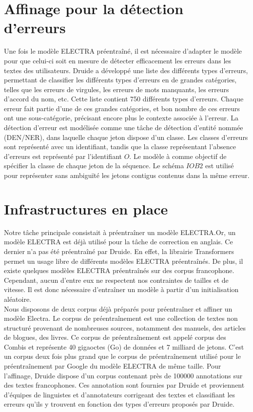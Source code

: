 \documentclass[12pt,twoside,maitrise]{dms}
\theoremstyle{definition}
\numberwithin{equation}{section}
\numberwithin{table}{chapter}
\numberwithin{figure}{chapter}
\begin{document}
\section{Affinage pour la détection d'erreurs}
Une fois le modèle ELECTRA préentraîné, il est nécessaire d'adapter le modèle
pour que celui-ci soit en mesure de détecter efficacement les erreurs dans les
textes des utilisateurs. Druide a développé une liste des différents types
d'erreurs, permettant de classifier les différents types d'erreurs en de
grandes catégories, telles que les erreurs de virgules, les erreurs de mots
manquants, les erreurs d'accord du nom, etc. Cette liste contient 750
différents types d'erreurs. Chaque erreur fait partie d'une de ces grandes
catégories, et bon nombre de ces erreurs ont une sous-catégorie, précisant
encore plus le contexte associée à l'erreur. La détection d'erreur est
modélisée comme une tâche de détection d'entité nommée (DEN/NER), dans laquelle
chaque jeton dispose d'un classe. Les classes d'erreurs sont représenté avec un
identifiant, tandis que la classe représentant l'absence d'erreurs est
représenté par l'identifiant $O$. Le modèle à comme objectif de spécifier la
classe de chaque jeton de la séquence. Le schéma $IOB2$ \cite{schemas} est
utilisé pour représenter sans ambiguïté les jetons contigus contenus dans la
même erreur.

\section{Infrastructures en place}
Notre tâche principale consistait à préentraîner un modèle ELECTRA.\@ Or, un
modèle ELECTRA est déjà utilisé pour la tâche de correction en anglais. Ce
dernier n'a pas été préentraîné par Druide. En effet, la librairie
Transformers\cite{wolf-etal-2020-transformers} permet un usage libre de
différents modèles ELECTRA préentraînés. De plus, il existe quelques modèles
ELECTRA préentraînés sur des corpus francophone. Cependant, aucun d'entre eux
ne respectent nos contraintes de tailles et de vitesse. Il est donc nécessaire
d'entraîner un modèle à partir d'un initialisation aléatoire.\\

Nous disposons de deux corpus déjà préparés pour préentraîner et affiner un
modèle Electra. Le corpus de préentraînement est une collection de textes non
structuré provenant de nombreuses sources, notamment des manuels, des articles
de blogues, des livres. Ce corpus de préentraînement est appelé corpus des
Combis et représente 40 gigaoctes (Go) de données et 7 milliard de jetons.
C'est un corpus deux fois plus grand que le corpus de préentraînement utilisé
pour le préentraînement par Google du modèle ELECTRA de même taille. Pour
l'affinage, Druide dispose d'un corpus contenant près de 100000 annotations sur
des textes francophones. Ces annotation sont fournies par Druide et proviennent
d'équipes de linguistes et d'annotateurs corrigeant des textes et classifiant
les erreurs qu'ils y trouvent en fonction des types d'erreurs proposés par
Druide.
\end{document}
